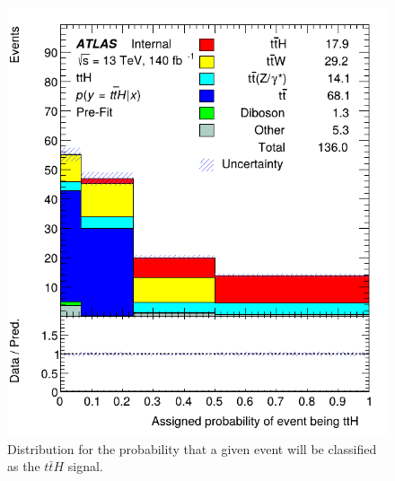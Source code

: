 \begin{figure}[ht]
    \centering
    
    \includegraphics[scale=0.4]{res/AnalysisPlots/probs-ttH.png}

    \caption{Distribution for the probability that a given event will be classified as the $t\bar{t}H$ signal.}
    \label{probsttH}
\end{figure}